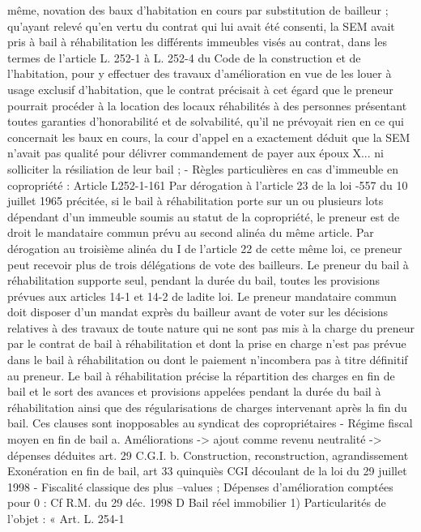 \documentclass[11pt,a4paper]{report}
\begin{document}
	même, novation des baux d'habitation en cours par substitution de bailleur ; qu'ayant relevé qu'en vertu du
	contrat qui lui avait été consenti, la SEM avait pris à bail à réhabilitation les différents immeubles visés au
	contrat, dans les termes de l'article L. 252-1 à L. 252-4 du Code de la construction et de l'habitation, pour y
	effectuer des travaux d'amélioration en vue de les louer à usage exclusif d'habitation, que le contrat précisait à
	cet égard que le preneur pourrait procéder à la location des locaux réhabilités à des personnes présentant toutes
	garanties d'honorabilité et de solvabilité, qu'il ne prévoyait rien en ce qui concernait les baux en cours, la cour
	d'appel en a exactement déduit que la SEM n'avait pas qualité pour délivrer commandement de payer aux époux
	X... ni solliciter la résiliation de leur bail ;
	- Règles particulières en cas d’immeuble en copropriété : Article L252-1-161
	Par dérogation à l'article 23 de la loi -557 du 10 juillet 1965 précitée, si le bail à réhabilitation porte sur
	un ou plusieurs lots dépendant d'un immeuble soumis au statut de la copropriété, le preneur est de droit le
	mandataire commun prévu au second alinéa du même article. Par dérogation au troisième alinéa du I de
	l'article 22 de cette même loi, ce preneur peut recevoir plus de trois délégations de vote des bailleurs.
	Le preneur du bail à réhabilitation supporte seul, pendant la durée du bail, toutes les provisions prévues aux
	articles 14-1 et 14-2 de ladite loi.
	Le preneur mandataire commun doit disposer d'un mandat exprès du bailleur avant de voter sur les décisions
	relatives à des travaux de toute nature qui ne sont pas mis à la charge du preneur par le contrat de bail à
	réhabilitation et dont la prise en charge n'est pas prévue dans le bail à réhabilitation ou dont le paiement
	n'incombera pas à titre définitif au preneur.
	Le bail à réhabilitation précise la répartition des charges en fin de bail et le sort des avances et provisions
	appelées pendant la durée du bail à réhabilitation ainsi que des régularisations de charges intervenant après la
	fin du bail. Ces clauses sont inopposables au syndicat des copropriétaires
	- Régime fiscal moyen en fin de bail
	a. Améliorations -> ajout comme revenu 
neutralité
-> dépenses déduites
 art. 29 C.G.I.
b. Construction, reconstruction, agrandissement
Exonération en fin de bail, art 33 quinquiès CGI découlant de la loi du 29
juillet 1998
- Fiscalité classique des plus –values ; Dépenses d’amélioration comptées pour 0 : Cf R.M. du 29 déc. 1998
D Bail réel immobilier
1) Particularités de l’objet : « Art. L. 254-1
\end{document}
